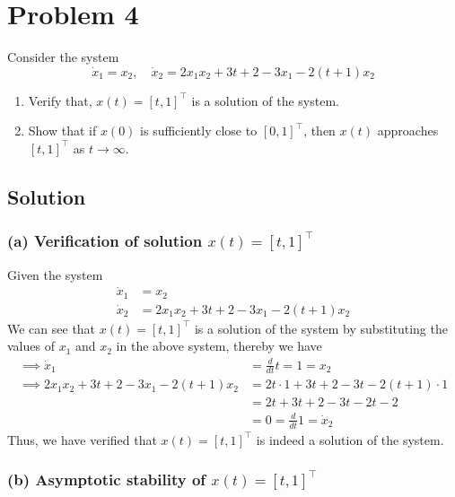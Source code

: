 \section*{Problem 4}

Consider the system
\begin{equation*}
    \dot{x}_{1}=x_{2}, \quad \dot{x}_{2}=2 x_{1} x_{2}+3 t+2-3 x_{1}-2(t+1) x_{2}
\end{equation*}
\begin{enumerate}[label= (\alph*)]
    \item Verify that, \( x(t)=[t, 1]^{\top} \) is a solution of the system.
    \item Show that if \( x(0) \) is sufficiently close to \( [0,1]^{\top} \), then \( x(t) \) approaches \( [t, 1]^{\top} \) as \( t \rightarrow \infty \).
\end{enumerate}

\subsection*{Solution}

\subsubsection*{(a) Verification of solution \( x(t) = {[t, 1]}^\top \)}

Given the system
\begin{align*}
    \dot{x}_{1}
     & =
    x_2
    \\
    \dot{x}_{2}
     & =
    2 x_{1} x_{2} + 3 t + 2 - 3 x_{1} - 2(t + 1) x_{2}
\end{align*}
We can see that \( x(t) = {[t, 1]}^\top \) is a solution of the system by substituting the values of \( x_1 \) and \( x_2 \) in the above system, thereby we have
\begin{align*}
    \implies
    \dot{x}_{1}
     & =
    \frac{d}{dt} t
    =
    1
    =
    x_2
    \\
    \implies
    2 x_{1} x_{2} + 3 t + 2 - 3 x_{1} - 2(t + 1) x_{2}
     & =
    2 t \cdot 1 + 3 t + 2 - 3 t - 2(t + 1) \cdot 1
    \\ & =
    2 t + 3 t + 2 - 3 t - 2 t - 2
    \\ & =
    0
    =
    \frac{d}{dt} 1
    =
    \dot{x}_{2}
\end{align*}
Thus, we have verified that \( x(t) = {[t, 1]}^\top \) is indeed a solution of the system.

\subsubsection*{(b) Asymptotic stability of \( x(t) = {[t, 1]}^\top \)}

